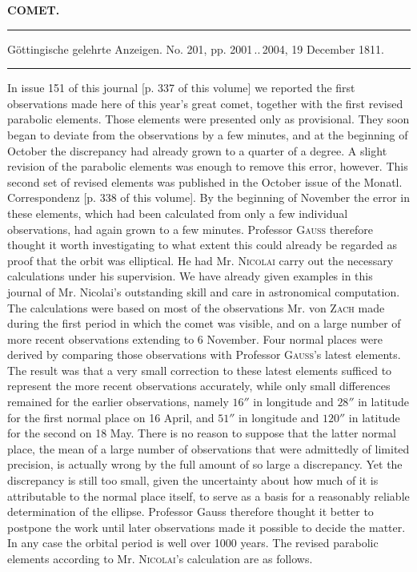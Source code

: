 \clearpage{}\hypertarget{native-347-lower}{}\label{native-347-lower}
\begin{center}\textbf{COMET.}\par\vspace{4pt}\hrule\vspace{4pt}\fontsize{10}{12}\selectfont Göttingische gelehrte Anzeigen. No. 201, pp. 2001\,..\,2004, 19 December 1811.\par\vspace{4pt}\hrule\vspace{4pt}\end{center}

\par\indent In issue 151 of this journal [p. 337 of this volume] we reported the first observations made here of this year’s great comet, together with the first revised parabolic elements. Those elements were presented only as provisional. They soon began to deviate from the observations by a few minutes, and at the beginning of October the discrepancy had already grown to a quarter of a degree. A slight revision of the parabolic elements was enough to remove this error, however. This second set of revised elements was published in the October issue of the Monatl. Correspondenz [p. 338 of this volume]. By the beginning of November the error in these elements, which had been calculated from only a few individual observations, had again grown to a few minutes. Professor \textsc{Gauss} therefore thought it worth investigating to what extent this could already be regarded as proof that the orbit was elliptical. He had Mr. \textsc{Nicolai} carry out the necessary calculations under his supervision. We have already given examples in this journal of Mr. Nicolai’s outstanding skill and care in astronomical computation. The calculations were based on most of the observations Mr. von \textsc{Zach} made during the first period in which the comet was visible, and on a large number of more recent observations extending to 6 November. Four normal places were derived by comparing those observations with Professor \textsc{Gauss}’s latest elements. The result was that a very small correction to these latest elements sufficed to represent the more recent observations accurately, while only small differences remained for the earlier observations, namely $16''$ in longitude and $28''$ in latitude for the first normal place on 16 April, and $51''$ in longitude and $120''$ in latitude for the second on 18 May. There is no reason to suppose that the latter normal place, the mean of a large number of observations that were admittedly of limited precision, is actually wrong by the full amount of so large a discrepancy. Yet the discrepancy is still too small, given the uncertainty about how much of it is attributable to the normal place itself, to serve as a basis for a reasonably reliable determination of the ellipse. Professor Gauss therefore thought it better to postpone the work until later observations made it possible to decide the matter. In any case the orbital period is well over 1000 years. The revised parabolic elements according to Mr. \textsc{Nicolai}’s calculation are as follows.

